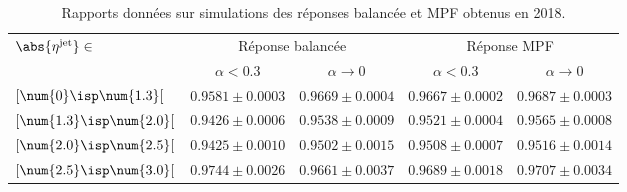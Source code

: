 \begin{table}[h]
\centering
\begin{tabular}{lcccc}
\toprule
\multirow{2}{*}{$\abs{\eta^\text{jet}}\in$} & \multicolumn{2}{c}{Réponse balancée} & \multicolumn{2}{c}{Réponse MPF} \\
\cmidrule(lr){2-3}\cmidrule(lr){4-5}
 & $\alpha<\num{0.3}$ & $\alpha\to0$ & $\alpha<\num{0.3}$ & $\alpha\to0$\\
\midrule
$[\num{0}\isp \num{1.3}[$ & $\num{0.9581}\pm\num{0.0003}$ & $\num{0.9669}\pm\num{0.0004}$ & $\num{0.9667}\pm\num{0.0002}$ & $\num{0.9687}\pm\num{0.0003}$ \\
$[\num{1.3}\isp \num{2.0}[$ & $\num{0.9426}\pm\num{0.0006}$ & $\num{0.9538}\pm\num{0.0009}$ & $\num{0.9521}\pm\num{0.0004}$ & $\num{0.9565}\pm\num{0.0008}$ \\
$[\num{2.0}\isp \num{2.5}[$ & $\num{0.9425}\pm\num{0.0010}$ & $\num{0.9502}\pm\num{0.0015}$ & $\num{0.9508}\pm\num{0.0007}$ & $\num{0.9516}\pm\num{0.0014}$ \\
$[\num{2.5}\isp \num{3.0}[$ & $\num{0.9744}\pm\num{0.0026}$ & $\num{0.9661}\pm\num{0.0037}$ & $\num{0.9689}\pm\num{0.0018}$ & $\num{0.9707}\pm\num{0.0034}$ \\
\bottomrule
\end{tabular}
\caption[Rapports des réponses balancée et MPF obtenus en 2018.]{Rapports données sur simulations des réponses balancée et MPF obtenus en 2018.}
\label{tab-responses_recap_table_2018ABCD}
\end{table}